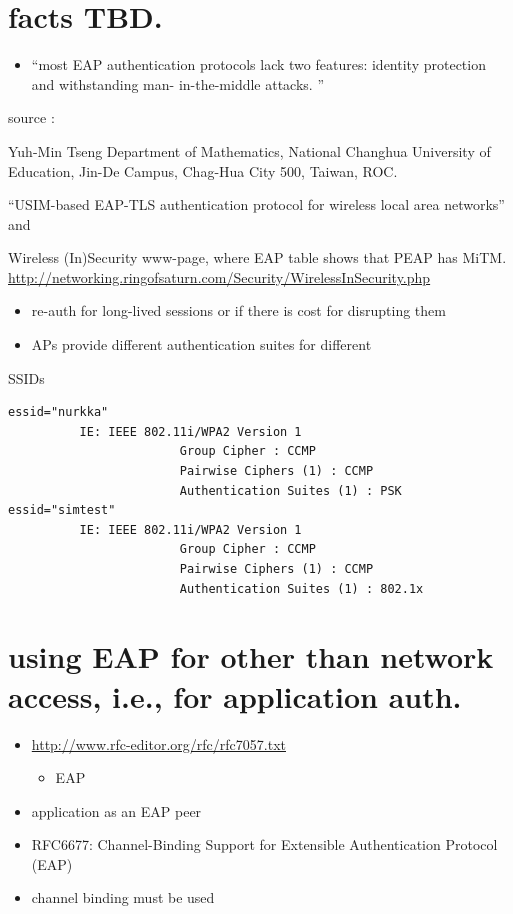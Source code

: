 \documentclass[12pt,a4paper,english]{tutthesis}
\begin{document}
\begin{otherlanguage}{english}
\section{facts TBD.}
\label{sec-8-1}
\begin{itemize}
\item ``most EAP authentication protocols lack two features: identity
protection and withstanding man- in-the-middle attacks. ''
\end{itemize}
source :

Yuh-Min Tseng Department of Mathematics, National Changhua University of Education,
Jin-De Campus, Chag-Hua City 500, Taiwan, ROC.

``USIM-based EAP-TLS authentication protocol for
wireless local area networks''
and 

Wireless (In)Security www-page, where 
EAP table shows that PEAP has MiTM.
\url{http://networking.ringofsaturn.com/Security/WirelessInSecurity.php}

\begin{itemize}
\item re-auth for long-lived sessions or if there is cost for disrupting them
\item APs provide different authentication suites for different
\end{itemize}
SSIDs 

\scriptsize
\begin{verbatim}
essid="nurkka"
          IE: IEEE 802.11i/WPA2 Version 1
                        Group Cipher : CCMP
                        Pairwise Ciphers (1) : CCMP
                        Authentication Suites (1) : PSK
essid="simtest"
          IE: IEEE 802.11i/WPA2 Version 1
                        Group Cipher : CCMP
                        Pairwise Ciphers (1) : CCMP
                        Authentication Suites (1) : 802.1x
\end{verbatim}
\normalsize

\section{using EAP for other than network access, i.e., for application auth.}
\label{sec-8-2}
\begin{itemize}
\item \url{http://www.rfc-editor.org/rfc/rfc7057.txt}
\begin{itemize}
\item EAP
\end{itemize}
\item application as an EAP peer
\item RFC6677: Channel-Binding Support for Extensible Authentication Protocol (EAP)
\item channel binding must be used
\end{itemize}


\end{otherlanguage}
\end{document}
